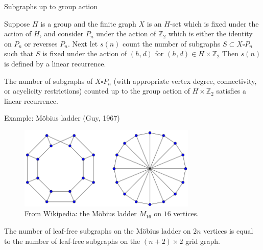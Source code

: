 \documentclass{beamer}%
\begin{document}
\begin{frame}{Subgraphs up to group action}
  \begin{theorem}
    Suppose $H$ is a group and the finite graph $X$ is an $H$-set which is
    fixed under the action of $H$, and consider $P_n$ under the action of
    $\mathbb Z_2$ which is either the identity on $P_n$ or reverses $P_n$.
    Next let $s(n)$ count the number of subgraphs $S \subset X \square P_n$
    such that $S$ is fixed under the action of $(h, d)$ for
    $(h, d) \in H \times \mathbb Z_2$
    Then $s(n)$ is defined by a linear recurrence.
  \end{theorem}
  \begin{corollary}
    The number of subgraphs of $X \square P_n$ (with appropriate vertex degree,
    connectivity, or acyclicity restrictions) counted up to the group action of
    $H \times \mathbb Z_2$ satisfies a linear recurrence.
  \end{corollary}
\end{frame}

\begin{frame}{Example: M\"obius ladder (Guy, 1967)}
  \begin{figure}
    \includegraphics[width=240pt]{diagrams/Moebius-ladder-16.png}
    \caption{From Wikipedia: the M\"obius ladder $M_{16}$ on $16$ vertices.}
  \end{figure}
  \begin{fact}
    The number of leaf-free subgraphs on the M\"obius ladder on $2n$ vertices is
    equal to the number of leaf-free subgraphs on the $(n + 2) \times 2$ grid
    graph.
  \end{fact}
\end{frame}
\end{document}
